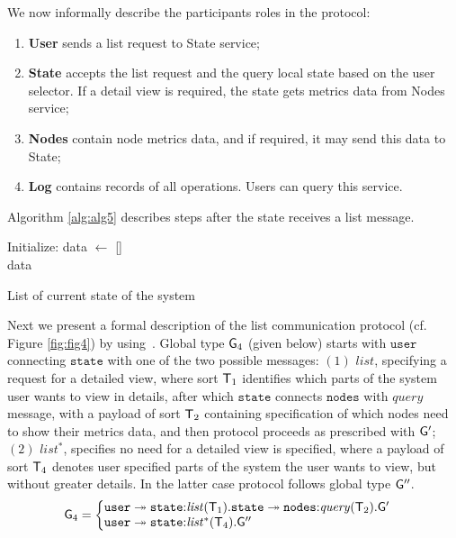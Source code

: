 We now informally describe the participants roles in the protocol:\label{list_protocol_informal_description}

\begin{enumerate}[start=1,label={(\bfseries \arabic*)}]
	\item \textbf{User} sends a list request to State service;
	\item \textbf{State} accepts the list request and the query local state based on the user selector. If a detail view is required, the state gets metrics data from Nodes service;
	\item \textbf{Nodes} contain node metrics data, and if required, it may send this data to State;
	\item \textbf{Log} contains records of all operations. Users can query this service.
\end{enumerate}

Algorithm \ref{alg:alg5} describes steps after the state receives a list message.

\begin{algorithm}[H]
	\SetAlgoLined
	Initialize: data $\leftarrow$ []\\
	\Return data
	\caption{List of current state of the system}
	\label{alg:alg5}
\end{algorithm}

Next we present a formal description of the list communication protocol (cf. Figure \ref{fig:fig4}) by using~\cite{HuY17}.
Global type ${\sf G}_4$ (given below) starts with $\mathtt{user}$ connecting $\mathtt{state}$ with one of the two possible messages: 
$(1)$ $\mathit{list}$, specifying a request for a detailed view, where sort ${\mathsf T}_1$ identifies which parts of the system user wants to view in details, after which $\mathtt{state}$ connects $\mathtt{nodes}$ with $\mathit{query}$ message, with a payload of sort ${\mathsf T}_2$  containing specification of which nodes need to show their metrics data, and then protocol proceeds as prescribed with ${\sf G}'$; 
$(2)$ $\mathit{list^*}$, specifies no need for a detailed view is specified, where a payload of sort ${\mathsf T}_4$ denotes user specified parts of the system the user wants to view, but without greater details. In the latter case protocol follows global type ${\sf G}''$.
\begin{align*}
\G_4 &= 
\left\{
\begin{array}{@{}l@{}}  
\mathtt{user} \twoheadrightarrow \mathtt{state}{:}\mathit{list}(\T_1).\mathtt{state}\twoheadrightarrow\mathtt{nodes}{:}\mathit{query}(\T_2). \G' \\
\mathtt{user} \twoheadrightarrow \mathtt{state}{:}\mathit{list^*}(\T_4).\G''
\end{array} \right.
\end{align*}

